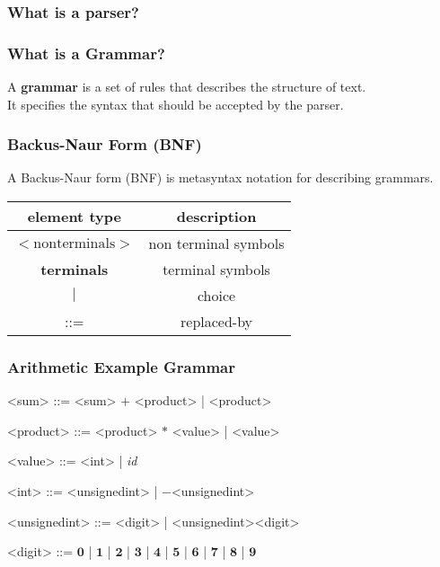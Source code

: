 \documentclass{beamer}
\begin{document}
\begin{frame}
\frametitle{What is a parser?}
\begin{center}
\scalebox{0.8}
{
}
\end{center}
\end{frame}

\begin{frame}
\frametitle{What is a Grammar?}

A \textbf{grammar} is a set of rules that describes the structure of text. \\
\bigskip
It specifies the syntax that should be accepted by the parser.
\end{frame}


\begin{frame}[fragile]
\frametitle{Backus-Naur Form (BNF)}
A Backus-Naur form (BNF) is metasyntax notation for describing grammars.

\begin{center}
  \begin{tabular}{ | c | c | }
    \hline
    element type & description \\ \hline\hline
    $<\mathrm{non terminals}>$ & non terminal symbols  \\ \hline
    \textbf{terminals} & terminal symbols  \\ \hline
    $|$ & choice  \\ \hline
    ::= & replaced-by  \\ 
    \hline
  \end{tabular}
\end{center}

\end{frame}

\begin{frame}[fragile]
\frametitle{Arithmetic Example Grammar}
\begin{grammar}
<sum> ::= <sum> $\mathbf{+}$ <product> | <product>

<product> ::= <product> $\mathbf{*}$ <value> | <value>

<value> ::= <int> | \textit{id}

<int> ::= <unsignedint> | $\mathbf{-}$<unsignedint>

<unsignedint> ::= <digit> | <unsignedint><digit>

<digit> ::= $\mathbf{0}$ | $\mathbf{1}$ | $\mathbf{2}$ | $\mathbf{3}$ | $\mathbf{4}$ | $\mathbf{5}$ | $\mathbf{6}$ | $\mathbf{7}$ | $\mathbf{8}$ | $\mathbf{9}$
 \end{grammar}
\end{frame}
\end{document}
